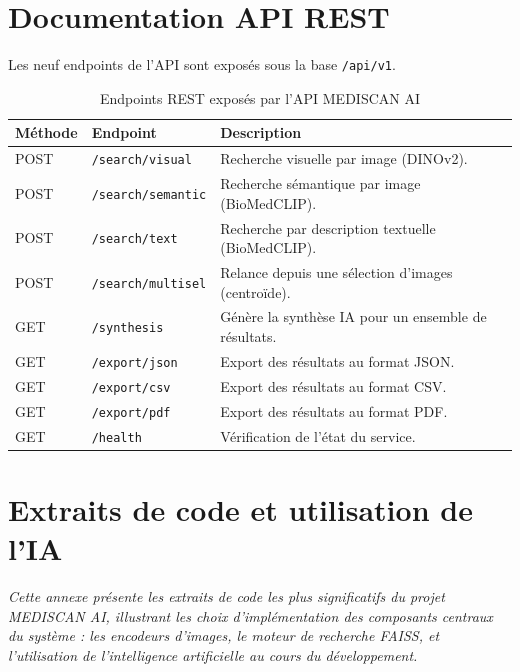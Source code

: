 \documentclass[12pt,a4paper]{article}
\newcommand{\IntroPartie}[1]{%
\vspace{0.2cm}
\begin{center}
\textit{#1}
\end{center}
\vspace{0.3cm}
}
\begin{document}
\section{Documentation API REST}

Les neuf endpoints de l'API sont exposés sous la base \texttt{/api/v1}.

\vspace{0.3cm}
\begin{table}[H]
\centering
\begin{tabularx}{\textwidth}{@{}llX@{}}
\toprule
\textbf{Méthode} & \textbf{Endpoint} & \textbf{Description} \\
\midrule
POST & \texttt{/search/visual}    & Recherche visuelle par image (DINOv2). \\
POST & \texttt{/search/semantic}  & Recherche sémantique par image (BioMedCLIP). \\
POST & \texttt{/search/text}      & Recherche par description textuelle (BioMedCLIP). \\
POST & \texttt{/search/multisel}  & Relance depuis une sélection d'images (centroïde). \\
GET  & \texttt{/synthesis}        & Génère la synthèse IA pour un ensemble de résultats. \\
GET  & \texttt{/export/json}      & Export des résultats au format JSON. \\
GET  & \texttt{/export/csv}       & Export des résultats au format CSV. \\
GET  & \texttt{/export/pdf}       & Export des résultats au format PDF. \\
GET  & \texttt{/health}           & Vérification de l'état du service. \\
\bottomrule
\end{tabularx}
\caption{Endpoints REST exposés par l'API MEDISCAN AI}
\label{tab:api-rest}
\end{table}

\section{Extraits de code et utilisation de l'IA}

\IntroPartie{Cette annexe présente les extraits de code les plus significatifs
du projet MEDISCAN AI, illustrant les choix d'implémentation des composants
centraux du système : les encodeurs d'images, le moteur de recherche FAISS,
et l'utilisation de l'intelligence artificielle au cours du développement.}

\end{document}
